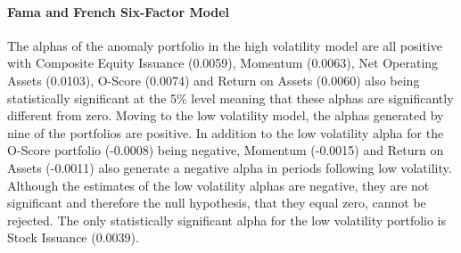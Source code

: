 \documentclass[12pt, a4paper, oneside]{article}
\begin{document}
\paragraph{Fama and French Six-Factor Model}
The alphas of the anomaly portfolio in the high volatility model are all positive with Composite Equity Issuance (0.0059), Momentum (0.0063), Net Operating Assets (0.0103), O-Score (0.0074) and Return on Assets (0.0060) also being statistically significant at the 5\% level meaning that these alphas are significantly different from zero. Moving to the low volatility model, the alphas generated by nine of the portfolios are positive. In addition to the low volatility alpha for the O-Score portfolio (-0.0008) being negative, Momentum (-0.0015) and Return on Assets (-0.0011) also generate a negative alpha in periods following low volatility. Although the estimates of the low volatility alphas are negative, they are not significant and therefore the null hypothesis, that they equal zero, cannot be rejected. The only statistically significant alpha for the low volatility portfolio is Stock Issuance (0.0039).
\end{document}
